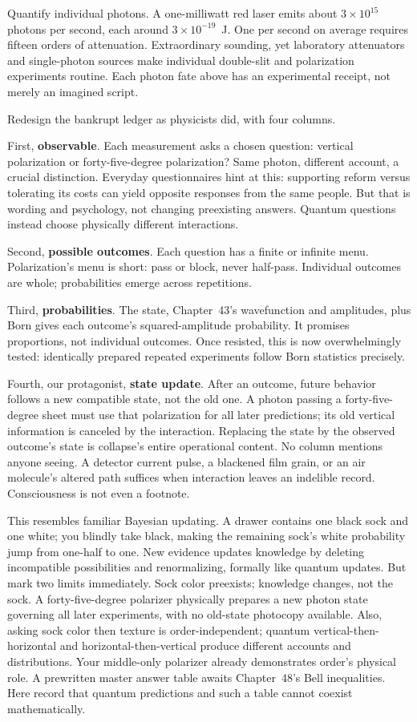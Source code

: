 Quantify individual photons. A one-milliwatt red laser emits about $3\times10^{15}$ photons per second, each around $3\times10^{-19}$~J. One per second on average requires fifteen orders of attenuation. Extraordinary sounding, yet laboratory attenuators and single-photon sources make individual double-slit and polarization experiments routine. Each photon fate above has an experimental receipt, not merely an imagined script.


Redesign the bankrupt ledger as physicists did, with four columns.

First, \textbf{observable}. Each measurement asks a chosen question: vertical polarization or forty-five-degree polarization? Same photon, different account, a crucial distinction. Everyday questionnaires hint at this: supporting reform versus tolerating its costs can yield opposite responses from the same people. But that is wording and psychology, not changing preexisting answers. Quantum questions instead choose physically different interactions.

Second, \textbf{possible outcomes}. Each question has a finite or infinite menu. Polarization's menu is short: pass or block, never half-pass. Individual outcomes are whole; probabilities emerge across repetitions.

Third, \textbf{probabilities}. The state, Chapter~43's wavefunction and amplitudes, plus Born gives each outcome's squared-amplitude probability. It promises proportions, not individual outcomes. Once resisted, this is now overwhelmingly tested: identically prepared repeated experiments follow Born statistics precisely.

Fourth, our protagonist, \textbf{state update}. After an outcome, future behavior follows a new compatible state, not the old one. A photon passing a forty-five-degree sheet must use that polarization for all later predictions; its old vertical information is canceled by the interaction. Replacing the state by the observed outcome's state is collapse's entire operational content. No column mentions anyone seeing. A detector current pulse, a blackened film grain, or an air molecule's altered path suffices when interaction leaves an indelible record. Consciousness is not even a footnote.

This resembles familiar Bayesian updating. A drawer contains one black sock and one white; you blindly take black, making the remaining sock's white probability jump from one-half to one. New evidence updates knowledge by deleting incompatible possibilities and renormalizing, formally like quantum updates. But mark two limits immediately. Sock color preexists; knowledge changes, not the sock. A forty-five-degree polarizer physically prepares a new photon state governing all later experiments, with no old-state photocopy available. Also, asking sock color then texture is order-independent; quantum vertical-then-horizontal and horizontal-then-vertical produce different accounts and distributions. Your middle-only polarizer already demonstrates order's physical role. A prewritten master answer table awaits Chapter~48's Bell inequalities. Here record that quantum predictions and such a table cannot coexist mathematically.

